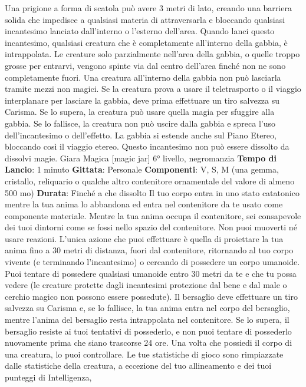 \begin{multicols}{2}
Una prigione a forma di scatola può avere 3 metri di
lato, creando una barriera solida che impedisce a
qualsiasi materia di attraversarla e bloccando qualsiasi
incantesimo lanciato dall’interno o l’esterno dell’area.
Quando lanci questo incantesimo, qualsiasi creatura
che è completamente all’interno della gabbia, è
intrappolata. Le creature solo parzialmente nell’area
della gabbia, o quelle troppo grosse per entrarvi,
vengono spinte via dal centro dell’area finché non ne
sono completamente fuori.
Una creatura all’interno della gabbia non può lasciarla
tramite mezzi non magici. Se la creatura prova a usare
il teletrasporto o il viaggio interplanare per lasciare la
gabbia, deve prima effettuare un tiro salvezza su
Carisma. Se lo supera, la creatura può usare quella
magia per sfuggire alla gabbia. Se lo fallisce, la
creatura non può uscire dalla gabbia e spreca l’uso
dell’incantesimo o dell’effetto. La gabbia si estende
anche sul Piano Etereo, bloccando così il viaggio
etereo.
Questo incantesimo non può essere dissolto da dissolvi
magie.
Giara Magica
[magic jar]
6° livello, negromanzia
\textbf{Tempo di Lancio}: 1 minuto
\textbf{Gittata}: Personale
\textbf{Componenti}: V, S, M (una gemma, cristallo, reliquario
o qualche altro contenitore ornamentale del valore di
almeno 500 mo)
\textbf{Durata}: Finché a che dissolto
Il tuo corpo entra in uno stato catatonico mentre la tua
anima lo abbandona ed entra nel contenitore da te
usato come componente materiale. Mentre la tua anima
occupa il contenitore, sei consapevole dei tuoi dintorni
come se fossi nello spazio del contenitore. Non puoi
muoverti né usare reazioni. L’unica azione che puoi
effettuare è quella di proiettare la tua anima fino a 30
metri di distanza, fuori dal contenitore, ritornando al tuo
corpo vivente (e terminando l’incantesimo) o cercando
di possedere un corpo umanoide.
Puoi tentare di possedere qualsiasi umanoide entro 30
metri da te e che tu possa vedere (le creature protette
dagli incantesimi protezione dal bene e dal male o
cerchio magico non possono essere possedute). Il
bersaglio deve effettuare un tiro salvezza su Carisma e,
se lo fallisce, la tua anima entra nel corpo del bersaglio,
mentre l’anima del bersaglio resta intrappolata nel
contenitore. Se lo supera, il bersaglio resiste ai tuoi
tentativi di possederlo, e non puoi tentare di possederlo
nuovamente prima che siano trascorse 24 ore.
Una volta che possiedi il corpo di una creatura, lo puoi
controllare. Le tue statistiche di gioco sono rimpiazzate
dalle statistiche della creatura, a eccezione del tuo
allineamento e dei tuoi punteggi di Intelligenza,

\end{multicols}

